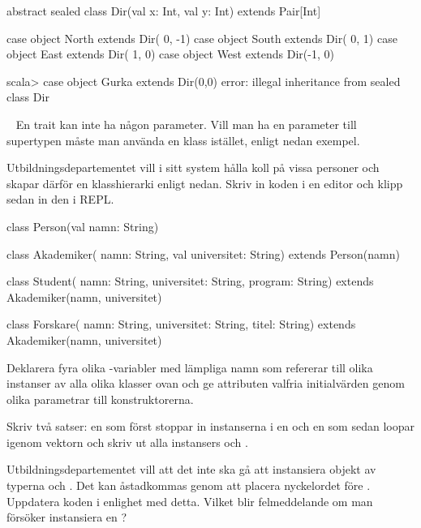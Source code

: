 \SubtaskSolved
\begin{CodeSmall}
abstract sealed class Dir(val x: Int, val y: Int) extends Pair[Int]

case object North extends Dir( 0, -1)
case object South extends Dir( 0,  1)
case object East  extends Dir( 1,  0)
case object West  extends Dir(-1,  0)
\end{CodeSmall}

\begin{REPLnonum}
scala> case object Gurka extends Dir(0,0)
error: illegal inheritance from sealed class Dir
\end{REPLnonum}

\QUESTEND







\QUESTBEGIN

\Task  \what~  En trait kan inte ha någon parameter. Vill man ha en parameter till supertypen måste man använda en klass istället, enligt nedan exempel.

Utbildningsdepartementet vill i sitt system hålla koll på vissa personer och skapar därför en klasshierarki enligt nedan. Skriv in koden i en editor och klipp sedan in den i REPL.
\begin{Code}
class Person(val namn: String)

class Akademiker(
  namn: String,
  val universitet: String) extends Person(namn)

class Student(
  namn: String,
  universitet: String,
  program: String) extends Akademiker(namn, universitet)

class Forskare(
  namn: String,
  universitet: String,
  titel: String) extends Akademiker(namn, universitet)
\end{Code}


\Subtask Deklarera fyra olika -variabler med lämpliga namn som refererar till olika instanser av alla olika klasser ovan och ge attributen valfria initialvärden genom olika parametrar till konstruktorerna.

\Subtask Skriv två satser: en som först stoppar in instanserna i en  och en som sedan loopar igenom vektorn och skriv ut alla instansers  och .

\Subtask Utbildningsdepartementet vill att det inte ska gå att instansiera objekt av typerna  och . Det kan åstadkommas genom att placera nyckelordet  före . Uppdatera koden i enlighet med detta. Vilket blir felmeddelande om man försöker instansiera en ?


